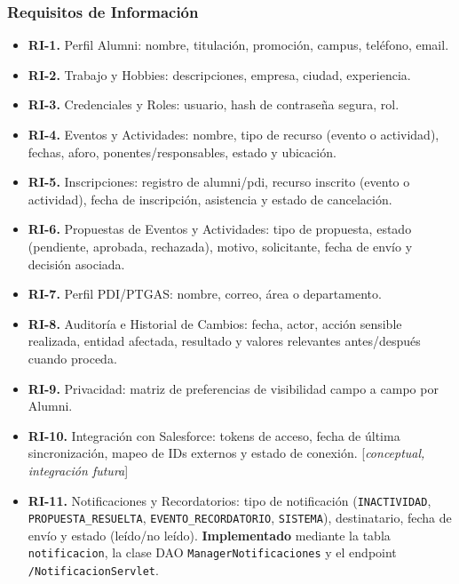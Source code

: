 \documentclass{report}
\begin{document}
\subsubsection{Requisitos de Información}
\begin{itemize}
    \item \textbf{RI-1.} Perfil Alumni: nombre, titulación, promoción, campus, teléfono, email.
    \item \textbf{RI-2.} Trabajo y Hobbies: descripciones, empresa, ciudad, experiencia.
    \item \textbf{RI-3.} Credenciales y Roles: usuario, hash de contraseña segura, rol.
    \item \textbf{RI-4.} Eventos y Actividades: nombre, tipo de recurso (evento o actividad), fechas, aforo, ponentes/responsables, estado y ubicación.
    \item \textbf{RI-5.} Inscripciones: registro de alumni/pdi, recurso inscrito (evento o actividad), fecha de inscripción, asistencia y estado de cancelación.
    \item \textbf{RI-6.} Propuestas de Eventos y Actividades: tipo de propuesta, estado (pendiente, aprobada, rechazada), motivo, solicitante, fecha de envío y decisión asociada.
    \item \textbf{RI-7.} Perfil PDI/PTGAS: nombre, correo, área o departamento.
    \item \textbf{RI-8.} Auditoría e Historial de Cambios: fecha, actor, acción sensible realizada, entidad afectada, resultado y valores relevantes antes/después cuando proceda.
    \item \textbf{RI-9.} Privacidad: matriz de preferencias de visibilidad campo a campo por Alumni.
    \item \textbf{RI-10.} Integración con Salesforce: tokens de acceso, fecha de última sincronización, mapeo de IDs externos y estado de conexión. [\textit{conceptual, integración futura}]
    \item \textbf{RI-11.} Notificaciones y Recordatorios: tipo de notificación (\texttt{INACTIVIDAD}, \texttt{PROPUESTA\_RESUELTA}, \texttt{EVENTO\_RECORDATORIO}, \texttt{SISTEMA}), destinatario, fecha de envío y estado (leído/no leído). \textbf{Implementado} mediante la tabla \texttt{notificacion}, la clase DAO \texttt{ManagerNotificaciones} y el endpoint \texttt{/NotificacionServlet}.
\end{itemize}
\end{document}
